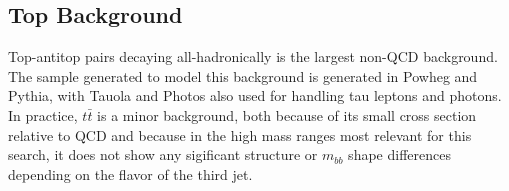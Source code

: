 


\subsection{Top Background}
Top-antitop pairs decaying all-hadronically is the largest non-QCD background.  The sample generated
to model this background is generated in Powheg and Pythia, with Tauola and Photos also used for
handling tau leptons and photons.  In practice, $t\bar{t}$ is a minor background, both because
of its small cross section relative to QCD and because in the high mass ranges most relevant for
this search, it does not show any sigificant structure or $m_{bb}$ shape differences depending
on the flavor of the third jet.









